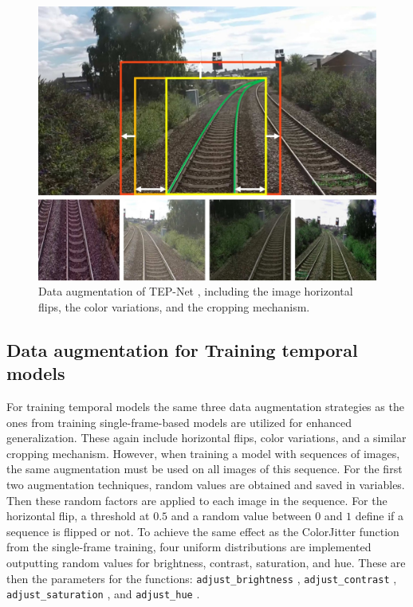 \begin{figure}[H]
    \centering
    \includegraphics[width=0.6\linewidth]{PICs/Baselinepaper/data_augmenation.jpg}
    \caption{Data augmentation of \ac{TEP}-Net \cite{tepNet2024}, including the image horizontal flips, the color variations, and the cropping mechanism.}
    \label{fig:tepNet_dataaugmentation}
\end{figure}

\subsection{Data augmentation for Training temporal models}
\label{sec:dataAugmentationTemporal}

For training temporal models the same three data augmentation strategies as the ones from training single-frame-based models are utilized for enhanced generalization.
These again include horizontal flips, color variations, and a similar cropping mechanism.
However, when training a model with sequences of images, the same augmentation must be used on all images of this sequence.
For the first two augmentation techniques, random values are obtained and saved in variables.
Then these random factors are applied to each image in the sequence.
For the horizontal flip, a threshold at $0.5$ and a random value between $0$ and $1$ define if a sequence is flipped or not.
To achieve the same effect as the ColorJitter \cite{pytorch_colorJitter_docu} function from the single-frame training, four uniform distributions are implemented outputting random values for brightness, contrast, saturation, and hue.
These are then the parameters for the functions: \texttt{adjust\_brightness} \cite{pytorch_adjust_brightness_docu}, \texttt{adjust\_contrast} \cite{pytorch_adjust_contrast_docu}, \texttt{adjust\_saturation} \cite{pytorch_adjust_saturation_docu}, and \texttt{adjust\_hue} \cite{pytorch_adjust_hue_docu}.


